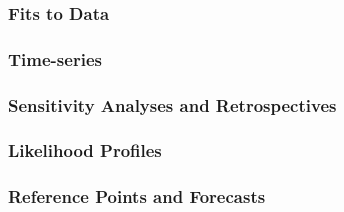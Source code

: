 \documentclass[11pt,
  english,
  letterpaper,
]{article}
\begin{document}
\hypertarget{fits-to-data}{%
\subsubsection{Fits to Data}\label{fits-to-data}}

\hypertarget{time-series}{%
\subsubsection{Time-series}\label{time-series}}

\hypertarget{sensitivity-analyses-and-retrospectives}{%
\subsubsection{Sensitivity Analyses and Retrospectives}\label{sensitivity-analyses-and-retrospectives}}

\hypertarget{likelihood-profiles-1}{%
\subsubsection{Likelihood Profiles}\label{likelihood-profiles-1}}

\hypertarget{reference-points-and-forecasts}{%
\subsubsection{Reference Points and Forecasts}\label{reference-points-and-forecasts}}
\end{document}

